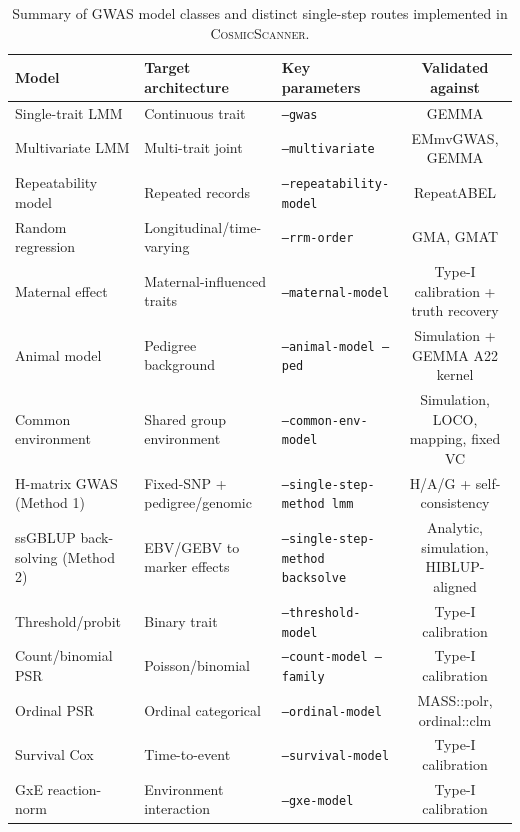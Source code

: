 \documentclass[11pt,a4paper]{article}
\newcommand{\CosmicScanner}{\textsc{CosmicScanner}}
\begin{document}
\begin{table}[H]
  \centering
  \caption{Summary of GWAS model classes and distinct single-step routes implemented in \CosmicScanner.}
  \label{tab:summary}
  \begin{threeparttable}
  \begin{tabular}{lllc}
  \toprule
  Model & Target architecture & Key parameters & Validated against \\
  \midrule
  Single-trait LMM & Continuous trait & \texttt{--gwas} & GEMMA \\
  Multivariate LMM & Multi-trait joint & \texttt{--multivariate} & EMmvGWAS, GEMMA \\
  Repeatability model & Repeated records & \texttt{--repeatability-model} & RepeatABEL \\
  Random regression & Longitudinal/time-varying & \texttt{--rrm-order} & GMA, GMAT \\
  Maternal effect & Maternal-influenced traits & \texttt{--maternal-model} & Type-I calibration + truth recovery \\
  Animal model & Pedigree background & \texttt{--animal-model --ped} & Simulation + GEMMA A22 kernel \\
  Common environment & Shared group environment & \texttt{--common-env-model} & Simulation, LOCO, mapping, fixed VC \\
  H-matrix GWAS (Method 1) & Fixed-SNP + pedigree/genomic & \texttt{--single-step-method lmm} & H/A/G + self-consistency \\
  ssGBLUP back-solving (Method 2) & EBV/GEBV to marker effects & \texttt{--single-step-method backsolve} & Analytic, simulation, HIBLUP-aligned \\
  Threshold/probit & Binary trait & \texttt{--threshold-model} & Type-I calibration \\
  Count/binomial PSR & Poisson/binomial & \texttt{--count-model --family} & Type-I calibration \\
  Ordinal PSR & Ordinal categorical & \texttt{--ordinal-model} & MASS::polr, ordinal::clm \\
  Survival Cox & Time-to-event & \texttt{--survival-model} & Type-I calibration \\
  GxE reaction-norm & Environment interaction & \texttt{--gxe-model} & Type-I calibration \\
  \bottomrule
  \end{tabular}
  \end{threeparttable}
\end{table}
\end{document}
